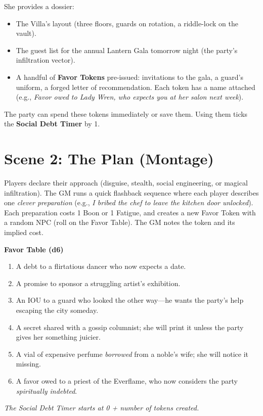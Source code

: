 \documentclass[12pt]{book}
\begin{document}
She provides a dossier:
\begin{itemize}
    \item The Villa's layout (three floors, guards on rotation, a riddle-lock on the vault).
    \item The guest list for the annual Lantern Gala tomorrow night (the party's infiltration vector).
    \item A handful of \textbf{Favor Tokens} pre-issued: invitations to the gala, a guard's uniform, a forged letter of recommendation. Each token has a name attached (e.g., \textit{Favor owed to Lady Wren, who expects you at her salon next week}).
\end{itemize}

The party can spend these tokens immediately or save them. Using them ticks the \textbf{Social Debt Timer } by 1.

\section{Scene 2: The Plan (Montage)}

Players declare their approach (disguise, stealth, social engineering, or magical infiltration). The GM runs a quick flashback sequence where each player describes one \textit{clever preparation} (e.g., \textit{I bribed the chef to leave the kitchen door unlocked}). Each preparation costs 1 Boon or 1 Fatigue, and creates a new Favor Token with a random NPC (roll on the Favor Table). The GM notes the token and its implied cost.

\begin{infobox}
\textbf{Favor Table (d6)}
\begin{enumerate}
    \item A debt to a flirtatious dancer who now expects a date.
    \item A promise to sponsor a struggling artist's exhibition.
    \item An IOU to a guard who looked the other way---he wants the party's help escaping the city someday.
    \item A secret shared with a gossip columnist; she will print it unless the party gives her something juicier.
    \item A vial of expensive perfume \textit{borrowed} from a noble's wife; she will notice it missing.
    \item A favor owed to a priest of the Everflame, who now considers the party \textit{spiritually indebted}.
\end{enumerate}
\textit{The Social Debt Timer starts at 0 + number of tokens created.}
\end{infobox}
\end{document}
